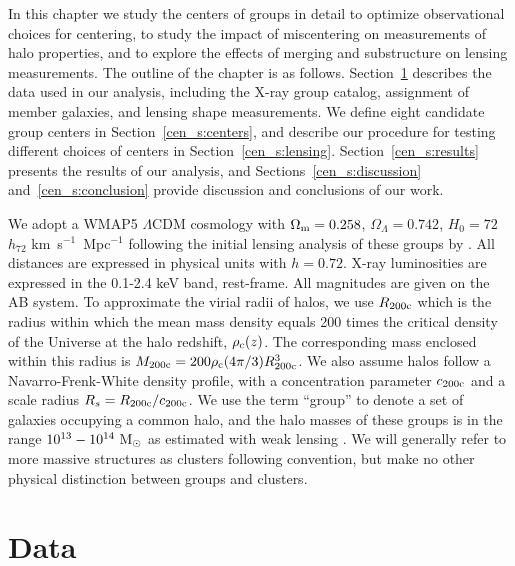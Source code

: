 In this chapter we study the centers of groups in
detail to optimize observational choices for centering, to study the
impact of miscentering on measurements of halo properties, and to
explore the effects of merging and substructure on lensing
measurements. The outline of the chapter is as follows. Section~\ref{cen_s:data} describes the data used in our
analysis, including the X-ray group catalog, assignment of member galaxies,
and lensing shape measurements. We define eight candidate group
centers in Section~\ref{cen_s:centers}, and describe our procedure for
testing different choices of centers in Section~\ref{cen_s:lensing}. Section~\ref{cen_s:results}
presents the results of our analysis, and Sections~\ref{cen_s:discussion}
and~\ref{cen_s:conclusion} provide discussion and conclusions of our work.

We adopt a WMAP5 $\Lambda$CDM cosmology with $\Omega_{\rm m}=0.258$,
$\Omega_\Lambda=0.742$, $H_0=72$ $h_{72}$ km~s$^{-1}$~Mpc$^{-1}$
\citep{Dunkley2009} following the initial lensing analysis of these
groups by \citet{Leauthaud2010}. All distances are expressed in
physical units with $h=0.72$. X-ray luminosities are expressed in the 0.1-2.4 keV
band, rest-frame. All magnitudes are given on the AB system. To
approximate the virial radii of halos, we use $R_{\rm 200c}$ which is
the radius within which the mean mass density equals 200 times the
critical density of the Universe at the halo redshift, $\rho_{\rm
  c}(z)$. The corresponding mass enclosed within this radius is
$M_{\rm 200c}=200\rho_{\rm c}(4\pi/3)R_{\rm 200c}^3$. We also assume
halos follow a Navarro-Frenk-White \citep[NFW, ][]{Navarro1996} density
profile, with a concentration parameter $c_{\rm 200c}$ and a scale radius
$R_{s}=R_{\rm 200c}/c_{\rm 200c}$. We use the term ``group'' to 
denote a set of galaxies occupying a common halo, and the halo masses
of these groups is in the range $10^{13}-10^{14}~{\rm M_{\odot}}$ as
estimated with weak lensing \citep{Leauthaud2010}. We will generally
refer to more massive structures as clusters following convention, but
make no other physical distinction between groups and clusters.


\section{Data}
\label{cen_s:data}

